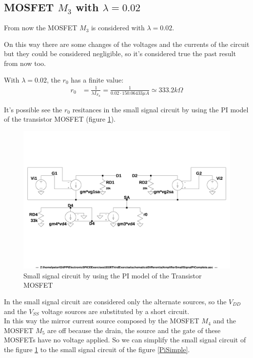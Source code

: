 \documentclass[10pt,a4paper]{book}
\begin{document}
\subsection{MOSFET $M_3$ with $\lambda = 0.02$}
From now the MOSFET $M_3$ is considered with $\lambda = 0.02$.\par
On this way there are some changes of the voltages and the currents of the circuit but they could be considered negligible, so it's considered true the past result from now too.\par
With $\lambda = 0.02$, the $r_0$ has a finite value:\\
\begin{align}
r_0 &= \frac{1}{\lambda I_{S_A}}
= \frac{1}{0.02 \cdot 150.06433 \mu A}
\simeq 333.2k\Omega
\end{align}

It's possible see the $r_0$ resitances in the small signal circuit by using the PI model of the transistor MOSFET (figure \ref{PiComplete}).\par

\begin{figure}[h]
  \centering
  \includegraphics[width=12cm]{schematics/DifferentialAmplifierSmallSignalPiComplete.jpg}
  \caption{Small signal circuit by using the PI model of the Transistor MOSFET}
  \label{PiComplete}
\end{figure}

In the small signal circuit are considered only the alternate sources, so the $V_{DD}$ and the $V_{SS}$ voltage sources are substituted by a short circuit.\\
In this way the mirror current source composed by the MOSFET $M_4$ and the MOSFET $M_5$ are off because the drain, the source and the gate of these MOSFETs have no voltage applied. So we can simplify the small signal circuit of the figure \ref{PiComplete} to the small signal circuit of the figure \ref{PiSimple}.\par
\end{document}
